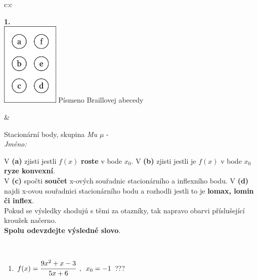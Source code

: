 \documentclass[10pt]{report}
\begin{document}
\begin{tabular}{c:c}
\begin{minipage}[c][104.5mm][t]{0.5\linewidth}
\begin{center}
\begin{minipage}{0.79\linewidth}
\end{minipage}
\begin{minipage}{0.20\linewidth}
\begin{center}
{\Huge\bfseries 1.} \\[2mm]
\includegraphics[height=40mm]{../images/braille.png}
{\small Písmeno Braillovej abecedy}
\end{center}
\end{minipage}
\end{center}
\end{minipage}
&
\begin{minipage}[c][104.5mm][t]{0.5\linewidth}
\begin{center}
\vspace{7mm}
{\huge Stacionární body, skupina \textit{Mu $\mu$} -}\\[5mm]
\textit{Jméno:}\phantom{xxxxxxxxxxxxxxxxxxxxxxxxxxxxxxxxxxxxxxxxxxxxxxxxxxxxxxxxxxxxxxxxx}\\[5mm]
\begin{minipage}{0.95\linewidth}
\begin{center}
{\small V \textbf{(a)} zjisti jestli $f(x)$ \textbf{roste} v bode $x_0$. V \textbf{(b)} zjisti jestli je $f(x)$ v bode $x_0$ \textbf{ryze konvexní}.\\V \textbf{(c)} spočti \textbf{součet} x-ových souřadnic stacionárního a inflexního bodu. V \textbf{(d)} najdi x-ovou souřadnici stacionárního bodu a rozhodli jestli to je \textbf{lomax, lomin či inflex}.\\Pokud se výsledky shodujú s těmi za otazníky, tak napravo obarvi příslušející kroužek načerno.\\\textbf{Spolu odevzdejte výsledné slovo}}.
\end{center}
\end{minipage}
\\[1mm]
\begin{minipage}{0.79\linewidth}
\begin{center}
\begin{varwidth}{\linewidth}
\begin{enumerate}
\normalsize
\item $f(x)=\cfrac{9x^2+x-3}{5x+6}\enspace , \enspace x_0=-1$\quad \dotfill\; ???\;\dotfill \quad {}

\end{enumerate}
\end{varwidth}
\end{center}
\end{minipage}
\end{center}
\end{minipage}
\end{tabular}
\end{document}
